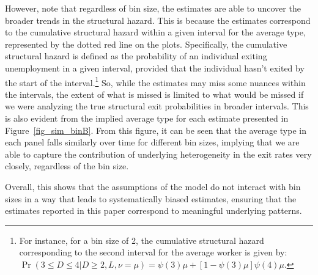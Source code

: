 \documentclass{div}
\newcommand{\outdir}{./../output}
\begin{document}
However, note that regardless of bin size, the estimates are able to uncover the broader trends in the structural hazard. This is because the estimates correspond to the cumulative structural hazard within a given interval for the average type, represented by the dotted red line on the plots. Specifically, the cumulative structural hazard is defined as the probability of an individual exiting unemployment in a given interval, provided that the individual hasn't exited by the start of the interval.\footnote{For instance, for a bin size of 2, the cumulative structural hazard corresponding to the second interval for the average worker is given by: \( \Pr(3 \leq D \leq 4 | D \geq 2, L, \nu = \mu) = \psi(3)\mu + [1-\psi(3)\mu]\psi(4)\mu \).} So, while the estimates may miss some nuances within the intervals, the extent of what is missed is limited to what would be missed if we were analyzing the true structural exit probabilities in broader intervals. This is also evident from the implied average type for each estimate presented in Figure~\ref{fig_sim_binB}. From this figure, it can be seen that the average type in each panel falls similarly over time for different bin sizes, implying that we are able to capture the contribution of underlying heterogeneity in the exit rates very closely, regardless of the bin size. 

Overall, this shows that the assumptions of the model do not interact with bin sizes in a way that leads to systematically biased estimates, ensuring that the estimates reported in this paper correspond to meaningful underlying patterns.

\end{document}
